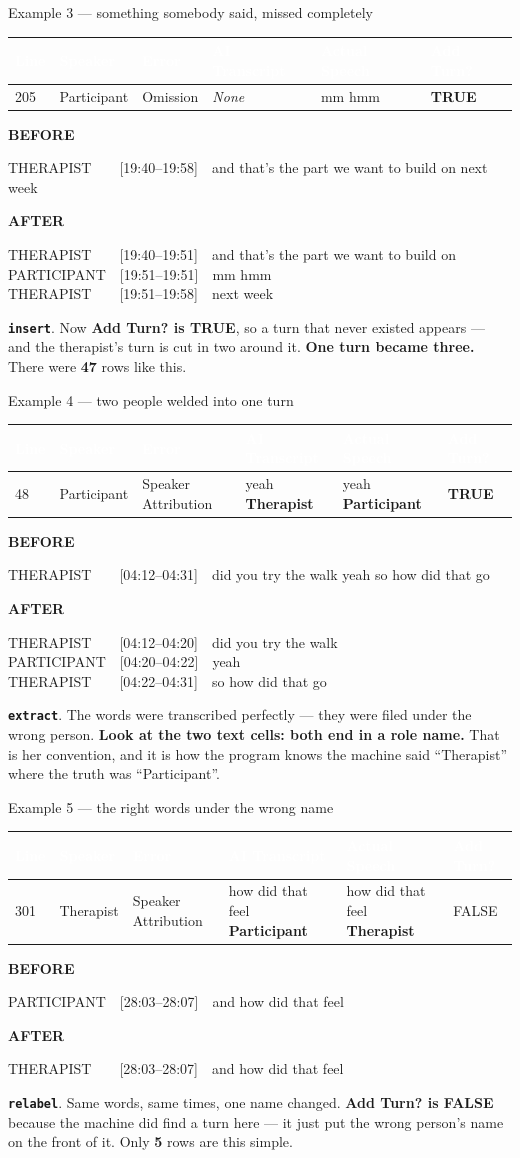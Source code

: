 \documentclass[aspectratio=169]{beamer}
\newcommand{\keybox}[1]{%
  \par\vspace{4pt}\begingroup\centering
  \colorbox{warmbg}{\parbox{0.93\textwidth}{\centering #1}}%
  \par\endgroup\vspace{2pt}}
\newcommand{\sheetrow}[6]{%
  \par\vspace{3pt}\begingroup\centering\footnotesize
  \renewcommand{\arraystretch}{1.3}\setlength{\tabcolsep}{5pt}%
  \begin{tabular}{|>{\raggedright\arraybackslash}p{0.6cm}|>{\raggedright\arraybackslash}p{1.6cm}|>{\raggedright\arraybackslash}p{2.4cm}|>{\raggedright\arraybackslash}p{2.9cm}|>{\raggedright\arraybackslash}p{2.9cm}|>{\raggedright\arraybackslash}p{1.0cm}|}
  \hline
  \rowcolor{hdr}
  \textcolor{white}{\textbf{Line}} & \textcolor{white}{\textbf{Speaker}} &
  \textcolor{white}{\textbf{Error}} & \textcolor{white}{\textbf{AI Transcript}} &
  \textcolor{white}{\textbf{Actual Speech}} & \textcolor{white}{\textbf{Add Turn?}} \\
  \hline
  \rowcolor{warmbg}
  #1 & #2 & #3 & #4 & #5 & #6 \\
  \hline
  \end{tabular}\par\endgroup\vspace{4pt}}
\newcommand{\before}[1]{%
  \par\vspace{3pt}\begingroup\centering
  {\footnotesize\textcolor{soft}{\textbf{BEFORE}}}\par\vspace{1pt}
  \colorbox{coolbg}{\parbox{0.90\textwidth}{\ttfamily\footnotesize #1}}%
  \par\endgroup\vspace{3pt}}
\newcommand{\after}[1]{%
  \par\vspace{2pt}\begingroup\centering
  {\footnotesize\textcolor{good}{\textbf{AFTER}}}\par\vspace{1pt}
  \colorbox{band}{\parbox{0.90\textwidth}{\ttfamily\footnotesize #1}}%
  \par\endgroup\vspace{3pt}}
\newcommand{\opn}[1]{\textcolor{warm}{\textbf{\texttt{#1}}}}
\newcommand{\num}[1]{\textcolor{warm}{\textbf{#1}}}
\begin{document}
\begin{frame}{Example 3 --- something somebody said, missed completely}

\sheetrow{205}{Participant}{Omission}{\textit{None}}{mm hmm}{\textbf{TRUE}}

\before{THERAPIST~~~~[19:40--19:58]~~and that's the part we want to build on next week}

\after{THERAPIST~~~~[19:40--19:51]~~and that's the part we want to build on\\
PARTICIPANT~~[19:51--19:51]~~mm hmm\\
THERAPIST~~~~[19:51--19:58]~~next week}

\keybox{\opn{insert}. Now \textbf{Add Turn? is TRUE}, so a turn that never existed appears
--- and the therapist's turn is cut in two around it. \textbf{One turn became three.} There
were \num{47} rows like this.}

\end{frame}

\begin{frame}{Example 4 --- two people welded into one turn}

\sheetrow{48}{Participant}{Speaker Attribution}{yeah \textbf{Therapist}}{yeah \textbf{Participant}}{\textbf{TRUE}}

\before{THERAPIST~~~~[04:12--04:31]~~did you try the walk yeah so how did that go}

\after{THERAPIST~~~~[04:12--04:20]~~did you try the walk\\
PARTICIPANT~~[04:20--04:22]~~yeah\\
THERAPIST~~~~[04:22--04:31]~~so how did that go}

\keybox{\opn{extract}. The words were transcribed perfectly --- they were filed under the
wrong person. \textbf{Look at the two text cells: both end in a role name.} That is her
convention, and it is how the program knows the machine said ``Therapist'' where the truth
was ``Participant''.}

\end{frame}

\begin{frame}{Example 5 --- the right words under the wrong name}

\sheetrow{301}{Therapist}{Speaker Attribution}{how did that feel \textbf{Participant}}{how did that feel \textbf{Therapist}}{FALSE}

\before{PARTICIPANT~~[28:03--28:07]~~and how did that feel}

\after{THERAPIST~~~~[28:03--28:07]~~and how did that feel}

\keybox{\opn{relabel}. Same words, same times, one name changed. \textbf{Add Turn? is
FALSE} because the machine did find a turn here --- it just put the wrong person's name on
the front of it. Only \num{5} rows are this simple.}

\end{frame}
\end{document}
